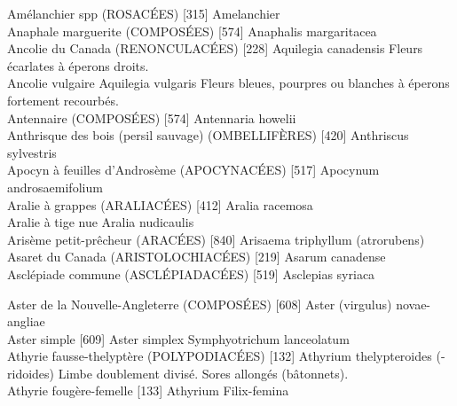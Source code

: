 Amélanchier spp (ROSACÉES)  [315]				
				Amelanchier\\

Anaphale marguerite (COMPOSÉES)  [574]
				Anaphalis margaritacea\\

Ancolie du Canada (RENONCULACÉES)  [228]
				Aquilegia canadensis
Fleurs écarlates à éperons droits.\\


Ancolie vulgaire
				Aquilegia vulgaris
Fleurs bleues, pourpres ou blanches à éperons fortement recourbés.\\


Antennaire (COMPOSÉES)  [574]
				Antennaria howelii\\
				


Anthrisque des bois (persil sauvage) (OMBELLIFÈRES)  [420]
				Anthriscus sylvestris\\
				

Apocyn à feuilles d’Androsème (APOCYNACÉES)  [517]
				Apocynum androsaemifolium\\


Aralie à grappes (ARALIACÉES)  [412]
				Aralia racemosa\\


Aralie à tige nue
				Aralia nudicaulis\\


Arisème petit-prêcheur (ARACÉES)  [840]					
				Arisaema triphyllum (atrorubens)\\


Asaret du Canada (ARISTOLOCHIACÉES)  [219]			
				Asarum canadense\\			


Asclépiade commune (ASCLÉPIADACÉES)  [519]
				Asclepias syriaca\\
\newpage

Aster de la Nouvelle-Angleterre (COMPOSÉES)  [608]
				Aster (virgulus)  novae-angliae\\

Aster simple  [609]
				Aster simplex
				Symphyotrichum lanceolatum\\

Athyrie fausse-thelyptère (POLYPODIACÉES)  [132]
				Athyrium thelypteroides (-ridoides)
Limbe doublement divisé. Sores allongés (bâtonnets).\\

Athyrie fougère-femelle  [133]
				Athyrium Filix-femina\\

